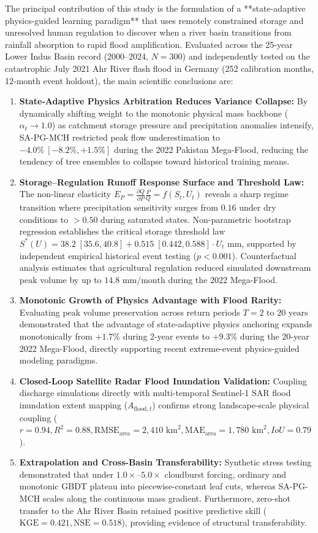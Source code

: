 \documentclass[11pt,a4paper,fleqn]{article}
\begin{document}
The principal contribution of this study is the formulation of a **state-adaptive physics-guided learning paradigm** that uses remotely constrained storage and unresolved human regulation to discover when a river basin transitions from rainfall absorption to rapid flood amplification. Evaluated across the 25-year Lower Indus Basin record (2000--2024, $N=300$) and independently tested on the catastrophic July 2021 Ahr River flash flood in Germany (252 calibration months, 12-month event holdout), the main scientific conclusions are:

\begin{enumerate}
    \item \textbf{State-Adaptive Physics Arbitration Reduces Variance Collapse:} By dynamically shifting weight to the monotonic physical mass backbone ($\alpha_t \to 1.0$) as catchment storage pressure and precipitation anomalies intensify, SA-PG-MCH restricted peak flow underestimation to $-4.0\%\ [-8.2\%, +1.5\%]$ during the 2022 Pakistan Mega-Flood, reducing the tendency of tree ensembles to collapse toward historical training means.
    \item \textbf{Storage--Regulation Runoff Response Surface and Threshold Law:} The non-linear elasticity $E_P = \frac{\partial Q}{\partial P}\frac{P}{Q} = f(S_t, U_t)$ reveals a sharp regime transition where precipitation sensitivity surges from $0.16$ under dry conditions to $>0.50$ during saturated states. Non-parametric bootstrap regression establishes the critical storage threshold law $S^*(U) = 38.2 \; [35.6, 40.8] + 0.515 \; [0.442, 0.588] \cdot U_t\text{ mm}$, supported by independent empirical historical event testing ($p < 0.001$). Counterfactual analysis estimates that agricultural regulation reduced simulated downstream peak volume by up to $14.8\text{ mm/month}$ during the 2022 Mega-Flood.
    \item \textbf{Monotonic Growth of Physics Advantage with Flood Rarity:} Evaluating peak volume preservation across return periods $T = 2\text{ to }20\text{ years}$ demonstrated that the advantage of state-adaptive physics anchoring expands monotonically from $+1.7\%$ during 2-year events to $+9.3\%$ during the 20-year 2022 Mega-Flood, directly supporting recent extreme-event physics-guided modeling paradigms.
    \item \textbf{Closed-Loop Satellite Radar Flood Inundation Validation:} Coupling discharge simulations directly with multi-temporal Sentinel-1 SAR flood inundation extent mapping ($A_{\text{flood},t}$) confirms strong landscape-scale physical coupling ($r = 0.94, R^2 = 0.88, \text{RMSE}_{\text{area}} = 2,410\text{ km}^2, \text{MAE}_{\text{area}} = 1,780\text{ km}^2, IoU = 0.79$).
    \item \textbf{Extrapolation and Cross-Basin Transferability:} Synthetic stress testing demonstrated that under $1.0\times\text{--}5.0\times$ cloudburst forcing, ordinary and monotonic GBDT plateau into piecewise-constant leaf cuts, whereas SA-PG-MCH scales along the continuous mass gradient. Furthermore, zero-shot transfer to the Ahr River Basin retained positive predictive skill ($\text{KGE} = 0.421, \text{NSE} = 0.518$), providing evidence of structural transferability.
\end{enumerate}
\end{document}
